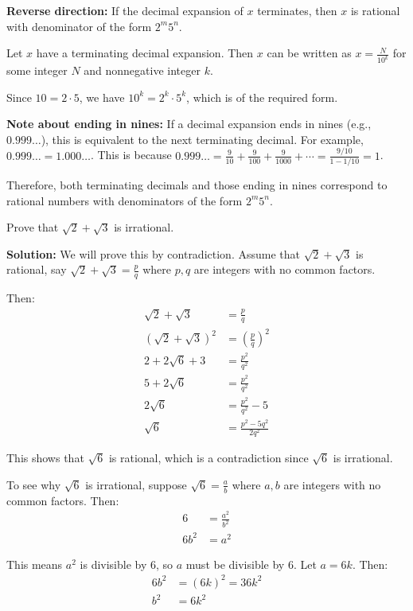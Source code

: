 \textbf{Reverse direction:} If the decimal expansion of $x$ terminates, then $x$ is rational with denominator of the form $2^m 5^n$.

Let $x$ have a terminating decimal expansion. Then $x$ can be written as $x = \frac{N}{10^k}$ for some integer $N$ and nonnegative integer $k$.

Since $10 = 2 \cdot 5$, we have $10^k = 2^k \cdot 5^k$, which is of the required form.

\textbf{Note about ending in nines:}
If a decimal expansion ends in nines (e.g., $0.999\ldots$), this is equivalent to the next terminating decimal. For example, $0.999\ldots = 1.000\ldots$. This is because $0.999\ldots = \frac{9}{10} + \frac{9}{100} + \frac{9}{1000} + \cdots = \frac{9/10}{1 - 1/10} = 1$.

Therefore, both terminating decimals and those ending in nines correspond to rational numbers with denominators of the form $2^m 5^n$.

\begin{problembox}
Prove that $\sqrt{2} + \sqrt{3}$ is irrational.
\end{problembox}

\textbf{Solution:}
We will prove this by contradiction. Assume that $\sqrt{2} + \sqrt{3}$ is rational, say $\sqrt{2} + \sqrt{3} = \frac{p}{q}$ where $p, q$ are integers with no common factors.

Then:
\begin{align*}
\sqrt{2} + \sqrt{3} &= \frac{p}{q} \\
(\sqrt{2} + \sqrt{3})^2 &= \left(\frac{p}{q}\right)^2 \\
2 + 2\sqrt{6} + 3 &= \frac{p^2}{q^2} \\
5 + 2\sqrt{6} &= \frac{p^2}{q^2} \\
2\sqrt{6} &= \frac{p^2}{q^2} - 5 \\
\sqrt{6} &= \frac{p^2 - 5q^2}{2q^2}
\end{align*}

This shows that $\sqrt{6}$ is rational, which is a contradiction since $\sqrt{6}$ is irrational.

To see why $\sqrt{6}$ is irrational, suppose $\sqrt{6} = \frac{a}{b}$ where $a, b$ are integers with no common factors. Then:
\begin{align*}
6 &= \frac{a^2}{b^2} \\
6b^2 &= a^2
\end{align*}

This means $a^2$ is divisible by 6, so $a$ must be divisible by 6. Let $a = 6k$. Then:
\begin{align*}
6b^2 &= (6k)^2 = 36k^2 \\
b^2 &= 6k^2
\end{align*}

